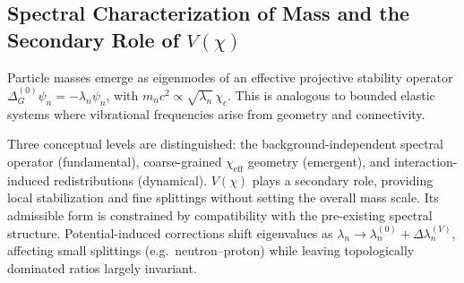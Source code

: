 \subsection{Spectral Characterization of Mass and the Secondary
Role of \texorpdfstring{$V(\chi)$}{V(χ)}}
  \label{subsec:spectral_mass}

  Particle masses emerge as eigenmodes of an effective projective
  stability operator $\Delta_G^{(0)}\psi_n = -\lambda_n\psi_n$, with
  $m_n c^2 \propto \sqrt{\lambda_n}\,\chi_c$.
  This is analogous to bounded elastic systems where vibrational
  frequencies arise from geometry and connectivity.

  Three conceptual levels are distinguished: the background-independent
  spectral operator (fundamental), coarse-grained
  $\chi_{\mathrm{eff}}$ geometry (emergent), and interaction-induced
  redistributions (dynamical).
  $V(\chi)$ plays a secondary role, providing local stabilization and
  fine splittings without setting the overall mass scale.
  Its admissible form is constrained by compatibility with the
  pre-existing spectral structure.
  Potential-induced corrections shift eigenvalues as
  $\lambda_n \to \lambda_n^{(0)} + \Delta\lambda_n^{(V)}$, affecting
  small splittings (e.g.\ neutron--proton) while leaving topologically
  dominated ratios largely invariant.
